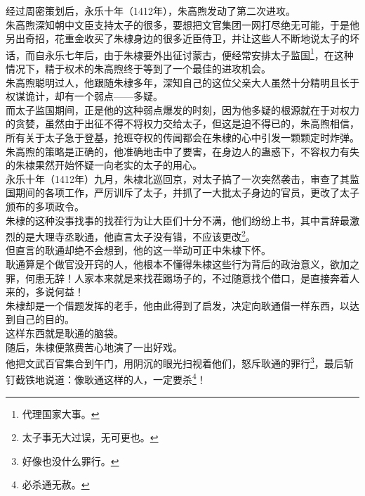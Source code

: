 \begin{multicols}{\theparacolNo}
经过周密策划后，永乐十年（1412年），朱高煦发动了第二次进攻。\\

朱高煦深知朝中文臣支持太子的很多，要想把文官集团一网打尽绝无可能，于是他另出奇招，花重金收买了朱棣身边的很多近臣侍卫，并让这些人不断地说太子的坏话，而自永乐七年后，由于朱棣要外出征讨蒙古，便经常安排太子监国\footnote{代理国家大事。}，在这种情况下，精于权术的朱高煦终于等到了一个最佳的进攻机会。\\

朱高煦聪明过人，他跟随朱棣多年，深知自己的这位父亲大人虽然十分精明且长于权谋诡计，却有一个弱点——多疑。\\

而太子监国期间，正是他的这种弱点爆发的时刻，因为他多疑的根源就在于对权力的贪婪，虽然由于出征不得不将权力交给太子，但这是迫不得已的，朱高煦相信，所有关于太子急于登基，抢班夺权的传闻都会在朱棣的心中引发一颗颗定时炸弹。\\

朱高煦的策略是正确的，他准确地击中了要害，在身边人的蛊惑下，不容权力有失的朱棣果然开始怀疑一向老实的太子的用心。\\

永乐十年（1412年）九月，朱棣北巡回京，对太子搞了一次突然袭击，审查了其监国期间的各项工作，严厉训斥了太子，并抓了一大批太子身边的官员，更改了太子颁布的多项政令。\\

朱棣的这种没事找事的找茬行为让大臣们十分不满，他们纷纷上书，其中言辞最激烈的是大理寺丞耿通，他直言太子没有错，不应该更改\footnote{太子事无大过误，无可更也。}。\\

但直言的耿通却绝不会想到，他的这一举动可正中朱棣下怀。\\

耿通算是个做官没开窍的人，他根本不懂得朱棣这些行为背后的政治意义，欲加之罪，何患无辞！人家本来就是来找茬踢场子的，不过随意找个借口，是直接奔着人来的，多说何益！\\

朱棣却是一个借题发挥的老手，他由此得到了启发，决定向耿通借一样东西，以达到自己的目的。\\

这样东西就是耿通的脑袋。\\

随后，朱棣便煞费苦心地演了一出好戏。\\

他把文武百官集合到午门，用阴沉的眼光扫视着他们，怒斥耿通的罪行\footnote{好像也没什么罪行。}，最后斩钉截铁地说道：像耿通这样的人，一定要杀\footnote{必杀通无赦。}！\\


\end{multicols}
